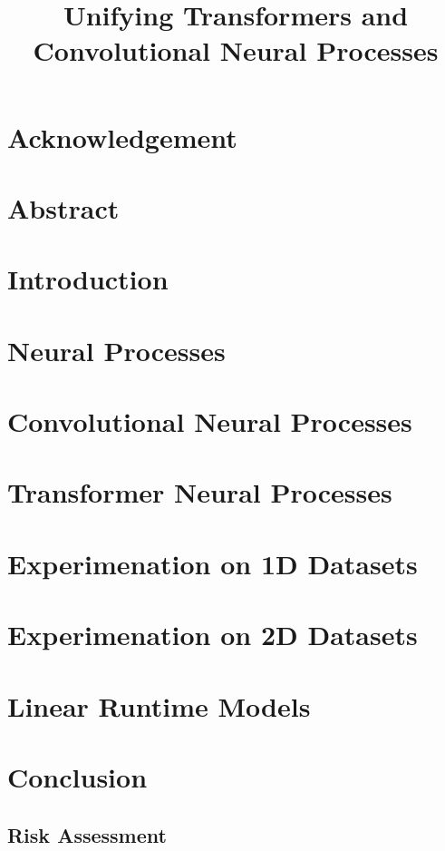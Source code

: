 \documentclass[12pt]{report}
\newcommand{\lrtitle}{
	Unifying Transformers and Convolutional Neural Processes
}
\begin{document}
\title{\textbf{\fontsize{24.88}{12}\selectfont \lrtitle}}
\author{{\LARGE \name}}

\reporttitlepage

\chapter*{Acknowledgement}

\newpage
\chapter*{Abstract}




\chapter{Introduction}


\chapter{Neural Processes}


\chapter{Convolutional Neural Processes}


\chapter{Transformer Neural Processes}



\chapter{Experimenation on 1D Datasets}


\chapter{Experimenation on 2D Datasets}


\chapter{Linear Runtime Models}


\chapter{Conclusion}



\printbibliography[heading=bibintoc]{}



\newpage
 

\begin{appendices}
\chapter{Risk Assessment}


\end{appendices}
\end{document}
